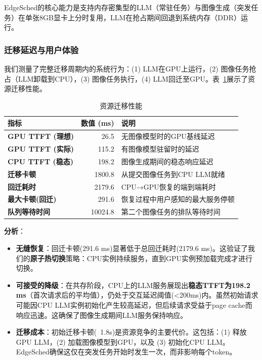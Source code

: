 EdgeSched的核心能力是支持内存密集型的LLM（常驻任务）与图像生成（突发任务）在单张8GB显卡上分时复用，LLM在抢占期间回退到系统内存（DDR）运行。

\subsubsection{迁移延迟与用户体验}

我们测量了完整迁移周期内的系统行为：(1) LLM在GPU上运行，(2) 图像任务抢占（LLM卸载到CPU），(3) 图像任务执行，(4) LLM回迁至GPU。表~\ref{tab:migration}展示了资源迁移性能。

\begin{table}[htbp]
\caption{资源迁移性能}
\label{tab:migration}
\centering
\begin{tabular}{@{}lrl@{}}
\toprule
指标 & 数值 (ms) & 说明 \\
\midrule
\textbf{GPU TTFT (理想)} & 26.5 & 无图像模型时的GPU基线延迟 \\
\textbf{GPU TTFT (实际)} & 115.2 & 有图像模型驻留时的延迟 \\
\textbf{CPU TTFT (稳态)} & 198.2 & 图像生成期间的稳态响应延迟 \\
\textbf{迁移卡顿} & 1800.8 & 从提交图像任务到CPU LLM就绪 \\
\textbf{回迁耗时} & 2179.6 & CPU→GPU恢复的端到端耗时 \\
\textbf{最大卡顿(回迁)} & 291.6 & 恢复过程中用户感知的最大服务停顿 \\
\textbf{队列等待时间} & 10024.8 & 第二个图像任务的排队等待时间 \\
\bottomrule
\end{tabular}
\end{table}

\textbf{分析}：
\begin{itemize}
\item \textbf{无缝恢复}：回迁卡顿(291.6 ms)显著低于总回迁耗时(2179.6 ms)。这验证了我们的\textbf{原子热切换}策略：CPU实例持续服务，直到GPU实例预加载完成才进行切换。
\item \textbf{可接受的降级}：在共存阶段，CPU上的LLM服务展现出\textbf{稳态TTFT为198.2 ms}（首次请求后的平均值），仍处于交互延迟阈值(<200ms)内。虽然初始请求可能因CPU LLM实例初始化产生较高延迟，但后续请求受益于page cache而响应迅速。这确保了图像生成期间LLM服务保持响应。
\item \textbf{迁移成本}：初始迁移卡顿(~1.8s)是资源竞争的主要代价。这包括：(1) 释放GPU LLM，(2) 加载图像模型到GPU，以及 (3) 初始化CPU LLM。EdgeSched确保这仅在突发任务开始时发生一次，而非影响每个token。
\end{itemize}

